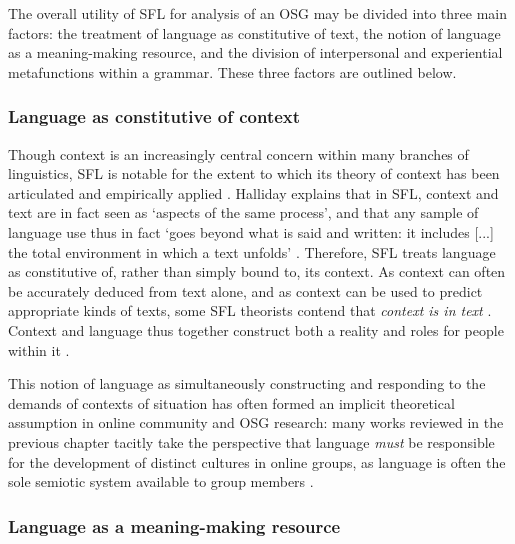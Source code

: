 
The overall utility of \gls{SFL} for analysis of an \gls{OSG} may be divided into three main factors: the treatment of language as constitutive of text, the notion of language as a meaning\hyp{}making resource, and the division of interpersonal and experiential metafunctions within a grammar. These three factors are outlined below.

\subsubsection{Language as constitutive of context} \label{sect:context-in-text}

Though context is an increasingly central concern within many branches of linguistics, \gls{SFL} is notable for the extent to which its theory of context has been articulated and empirically applied \cite{widdowson_text_2008}. Halliday explains that in \gls{SFL}, context and text are in fact seen as `aspects of the same process', and that any sample of language use thus in fact `goes beyond what is said and written: it includes [...] the total environment in which a text unfolds' \parencite*[p.~5]{halliday_language_1989}. Therefore, \gls{SFL} treats language as constitutive of, rather than simply bound to, its context. As context can often be accurately deduced from text alone, and as context can be used to predict appropriate kinds of texts, some \gls{SFL} theorists contend that \emph{context is in text} \cite[e.g.][p.~7]{eggins_introduction_2004}. Context and language thus together construct both a reality and roles for people within it \cite{veel_learning_1997}.

This notion of language as simultaneously constructing and responding to the demands of contexts of situation has often formed an implicit theoretical assumption in online community and \gls{OSG} research: many works reviewed in the previous chapter tacitly take the perspective that language \emph{must} be responsible for the development of distinct cultures in online groups, as language is often the sole semiotic system available to group members \cite{thorne_computer-mediated_2008}.


\subsubsection{Language as a meaning-making resource}

